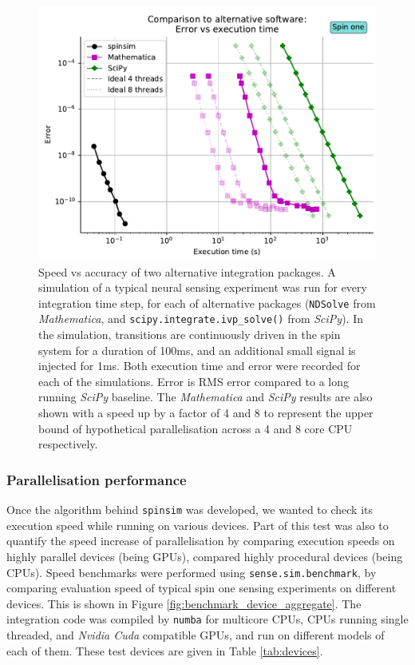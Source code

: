 \documentclass{jors}
\begin{document}
			\begin{figure}[h!]
				\includegraphics[scale=0.9]{benchmark_external_execution_error.pdf}
				\caption{Speed vs accuracy of two alternative integration packages. A simulation of a typical neural sensing experiment was run for every integration time step, for each of alternative packages (\texttt{NDSolve} from \emph{Mathematica}, and \texttt{scipy.integrate.ivp\_solve()} from \emph{SciPy}). In the simulation, transitions are continuously driven in the spin system for a duration of 100ms, and an additional small signal is injected for 1ms. Both execution time and error were recorded for each of the simulations. Error is RMS error compared to a long running \emph{SciPy} baseline. The \emph{Mathematica} and \emph{SciPy} results are also shown with a speed up by a factor of 4 and 8 to represent the upper bound of hypothetical parallelisation across a 4 and 8 core CPU respectively.}
				\label{fig:benchmark_external}
			\end{figure}

		\subsubsection{Parallelisation performance}
			Once the algorithm behind \texttt{spinsim} was developed, we wanted to check its execution speed while running on various devices. Part of this test was also to quantify the speed increase of parallelisation by comparing execution speeds on highly parallel devices (being GPUs), compared highly procedural devices (being CPUs). Speed benchmarks were performed using \texttt{sense.sim.benchmark}, by comparing evaluation speed of typical spin one sensing experiments on different devices. This is shown in Figure \ref{fig:benchmark_device_aggregate}. The integration code was compiled by \texttt{numba} for multicore CPUs, CPUs running single threaded, and \emph{Nvidia Cuda} compatible GPUs, and run on different models of each of them. These test devices are given in Table \ref{tab:devices}.
\end{document}
